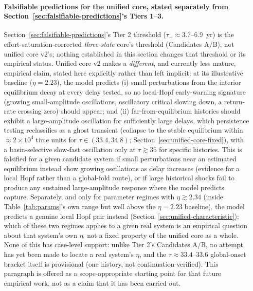 \documentclass[twocolumn,10pt]{article}
\begin{document}
\paragraph{Falsifiable predictions for the unified core, stated separately from Section~\ref{sec:falsifiable-predictions}'s Tiers 1--3.} Section~\ref{sec:falsifiable-predictions}'s Tier 2 threshold ($\tau_-\approx3.7$--$6.9$~yr) is the effort-saturation-corrected \emph{three-state} core's threshold (Candidates A/B), not unified core v2's; nothing established in this section changes that threshold or its empirical status. Unified core v2 makes a \emph{different}, and currently less mature, empirical claim, stated here explicitly rather than left implicit: at its illustrative baseline ($\eta=2.23$), the model predicts (i) small perturbations from the interior equilibrium decay at every delay tested, so no local-Hopf early-warning signature (growing small-amplitude oscillations, oscillatory critical slowing down, a return-rate crossing zero) should appear; and (ii) far-from-equilibrium histories should exhibit a large-amplitude oscillation for sufficiently large delays, which persistence testing reclassifies as a ghost transient (collapse to the stable equilibrium within $\approx2\times10^4$ time units for $\tau\in(33.4,34.8)$; Section~\ref{sec:unified-core-fixed}), with a basin-selective slow-fast oscillation only at $\tau\gtrsim35$ for specific histories. This is falsified for a given candidate system if small perturbations near an estimated equilibrium instead show growing oscillations as delay increases (evidence for a local Hopf rather than a global-fold route), or if large historical shocks fail to produce any sustained large-amplitude response where the model predicts capture. Separately, and only for parameter regimes with $\eta\gtrsim2.34$ (inside Table~\ref{tab:params}'s own range but well above the $\eta=2.23$ baseline), the model predicts a genuine local Hopf pair instead (Section~\ref{sec:unified-characteristic}); which of these two regimes applies to a given real system is an empirical question about that system's own $\eta$, not a fixed property of the unified core as a whole. None of this has case-level support: unlike Tier 2's Candidates A/B, no attempt has yet been made to locate a real system's $\eta$, and the $\tau\approx33.4$--$33.6$ global-onset bracket itself is provisional (one history, not continuation-verified). This paragraph is offered as a scope-appropriate starting point for that future empirical work, not as a claim that it has been carried out.
\end{document}
